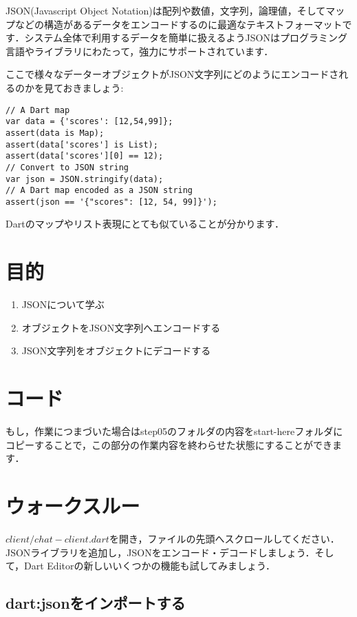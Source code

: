 
JSON(Javascript Object Notation)は配列や数値，文字列，論理値，そしてマップなどの構造があるデータをエンコードするのに最適なテキストフォーマットです．システム全体で利用するデータを簡単に扱えるようJSONはプログラミング言語やライブラリにわたって，強力にサポートされています．

ここで様々なデーターオブジェクトがJSON文字列にどのようにエンコードされるのかを見ておきましょう:

\begin{verbatim}
// A Dart map
var data = {'scores': [12,54,99]};
assert(data is Map);
assert(data['scores'] is List);
assert(data['scores'][0] == 12);
// Convert to JSON string
var json = JSON.stringify(data);
// A Dart map encoded as a JSON string
assert(json == '{"scores": [12, 54, 99]}');
\end{verbatim}

Dartのマップやリスト表現にとても似ていることが分かります．

\section{目的}

\begin{enumerate}
\item JSONについて学ぶ
\item オブジェクトをJSON文字列へエンコードする
\item JSON文字列をオブジェクトにデコードする
\end{enumerate}

\section{コード}

もし，作業につまづいた場合はstep05のフォルダの内容をstart-hereフォルダにコピーすることで，この部分の作業内容を終わらせた状態にすることができます．

\section{ウォークスルー}

$ client/chat-client.dart $を開き，ファイルの先頭へスクロールしてください．JSONライブラリを追加し，JSONをエンコード・デコードしましょう．そして，Dart Editorの新しいいくつかの機能も試してみましょう．

\subsection{dart:jsonをインポートする}

